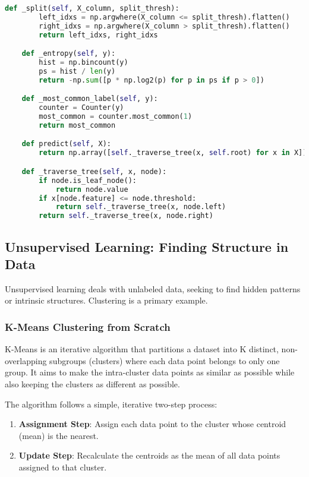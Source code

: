 \documentclass[11pt,a4paper]{article}
\begin{document}
\begin{lstlisting}[language=Python]
    def _split(self, X_column, split_thresh):
        left_idxs = np.argwhere(X_column <= split_thresh).flatten()
        right_idxs = np.argwhere(X_column > split_thresh).flatten()
        return left_idxs, right_idxs

    def _entropy(self, y):
        hist = np.bincount(y)
        ps = hist / len(y)
        return -np.sum([p * np.log2(p) for p in ps if p > 0])

    def _most_common_label(self, y):
        counter = Counter(y)
        most_common = counter.most_common(1)
        return most_common

    def predict(self, X):
        return np.array([self._traverse_tree(x, self.root) for x in X])

    def _traverse_tree(self, x, node):
        if node.is_leaf_node():
            return node.value
        if x[node.feature] <= node.threshold:
            return self._traverse_tree(x, node.left)
        return self._traverse_tree(x, node.right)
\end{lstlisting}

\subsection{Unsupervised Learning: Finding Structure in Data}

Unsupervised learning deals with unlabeled data, seeking to find hidden patterns or intrinsic structures. Clustering is a primary example.

\subsubsection{K-Means Clustering from Scratch}

K-Means is an iterative algorithm that partitions a dataset into K distinct, non-overlapping subgroups (clusters) where each data point belongs to only one group. It aims to make the intra-cluster data points as similar as possible while also keeping the clusters as different as possible.

The algorithm follows a simple, iterative two-step process:
\begin{enumerate}
    \item \textbf{Assignment Step}: Assign each data point to the cluster whose centroid (mean) is the nearest.
    \item \textbf{Update Step}: Recalculate the centroids as the mean of all data points assigned to that cluster.
\end{enumerate}
\end{document}
